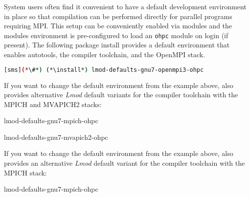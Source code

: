 System users often find it convenient to have a default development environment
in place so that compilation can be performed directly for parallel programs
requiring MPI. This setup can be conveniently enabled via modules and the \OHPC{}
modules environment is pre-configured to load an \texttt{ohpc} module on login
(if present). The following package install provides a default
environment that enables autotools, the \GNU{} compiler toolchain, and the
OpenMPI stack.

\begin{lstlisting}[language=bash]
[sms](*\#*) (*\install*) lmod-defaults-gnu7-openmpi3-ohpc
\end{lstlisting}


\begin{center}
\begin{tcolorbox}[]
\small
If you want to change the default environment from the example above, \OHPC{}
also provides alternative {\em Lmod} default variants for the \GNU{} compiler toolchain with the MPICH and MVAPICH2 stacks:
\begin{itemize*}
\item lmod-defaults-gnu7-mpich-ohpc
\item lmod-defaults-gnu7-mvapich2-ohpc
\end{itemize*}
\end{tcolorbox}
\end{center}

\else
\begin{center}
\begin{tcolorbox}[]
\small
If you want to change the default environment from the example above, \OHPC{}
also provides an alternative {\em Lmod} default variant for the \GNU{} compiler toolchain with the MPICH stack:
\begin{itemize*}
\item lmod-defaults-gnu7-mpich-ohpc
\end{itemize*}
\end{tcolorbox}
\end{center}

\fi
